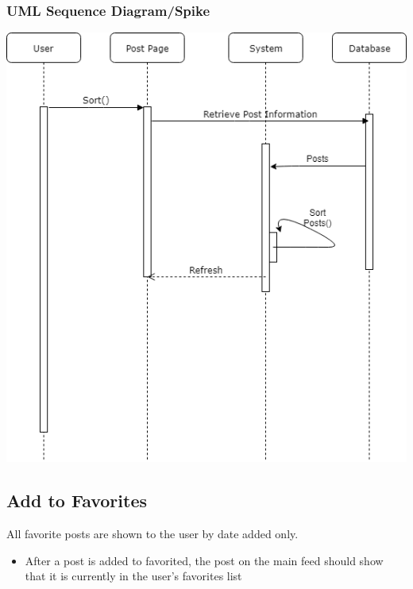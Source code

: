 \documentclass[12pt]{article}
\begin{document}
\subsubsection{UML Sequence Diagram/Spike}
\includegraphics[scale=0.5]{img/7.png}\linebreak

\subsection{Add to Favorites}
All favorite posts are shown to the user by date added only.
\begin{itemize}
  \item After a post is added to favorited, the post on the main feed should show that
it is currently in the user’s favorites list
\end{itemize}
\end{document}

